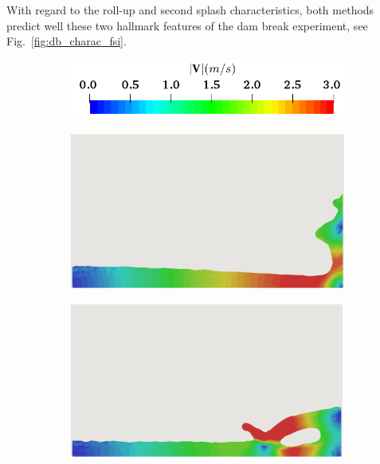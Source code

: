 With regard to the roll-up and second splash characteristics, both methods predict well these two hallmark features of the dam break experiment, see Fig.~\ref{fig:db_charac_fsi}.
\begin{figure}[H]
	\centering    
	\begin{subfigure}{0.35\columnwidth}    
		\centering
		\includegraphics[width=1.0\textwidth]{images/FSI_Comparison/DB_U.png}
	\end{subfigure}
	
	\begin{subfigure}{0.4\columnwidth}    
		\centering
		\includegraphics[width=1.0\textwidth]{images/FSI_Comparison/DB_FEM_1.png}
	\end{subfigure}
	\begin{subfigure}{0.4\columnwidth}
		\centering
		\includegraphics[width=1.0\textwidth]{images/FSI_Comparison/DB_FEM_2.png}

\end{subfigure}
\end{figure}
